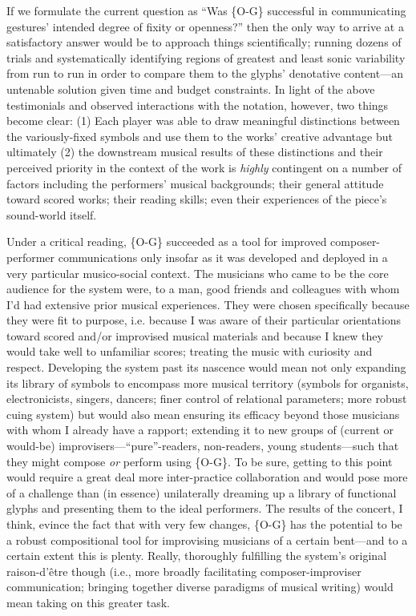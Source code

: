     If we formulate the current question as ``Was \{O-G\} successful in communicating gestures' intended degree of fixity or openness?'' then the only way to arrive at a satisfactory answer would be to approach things scientifically; running dozens of trials and systematically identifying regions of greatest and least sonic variability from run to run in order to compare them to the glyphs' denotative content---an untenable solution given time and budget constraints. In light of the above testimonials and observed interactions with the notation, however, two things become clear: (1) Each player was able to draw meaningful distinctions between the variously-fixed symbols and use them to the works' creative advantage but ultimately (2) the downstream musical results of these distinctions and their perceived priority in the context of the work is \textit{highly} contingent on a number of factors including the performers' musical backgrounds; their general attitude toward scored works; their reading skills; even their experiences of the piece's sound-world itself.

    Under a critical reading, \{O-G\} succeeded as a tool for improved composer-performer communications only insofar as it was developed and deployed in a very particular musico-social context. The musicians who came to be the core audience for the system were, to a man, good friends and colleagues with whom I'd had extensive prior musical experiences. They were chosen specifically because they were fit to purpose, i.e. because I was aware of their particular orientations toward scored and/or improvised musical materials and because I knew they would take well to unfamiliar scores; treating the music with curiosity and respect. Developing the system past its nascence would mean not only expanding its library of symbols to encompass more musical territory (symbols for organists, electronicists, singers, dancers; finer control of relational parameters; more robust cuing system) but would also mean ensuring its efficacy beyond those musicians with whom I already have a rapport; extending it to new groups of (current or would-be) improvisers---``pure''-readers, non-readers, young students---such that they might compose \textit{or} perform using \{O-G\}. To be sure, getting to this point would require a great deal more inter-practice collaboration and would pose more of a challenge than (in essence) unilaterally dreaming up a library of functional glyphs and presenting them to the ideal performers. The results of the concert, I think, evince the fact that with very few changes, \{O-G\} has the potential to be a robust compositional tool for improvising musicians of a certain bent---and to a certain extent this is plenty. Really, thoroughly fulfilling the system's original raison-d'\^{e}tre though (i.e., more broadly facilitating composer-improviser communication; bringing together diverse paradigms of musical writing) would mean taking on this greater task.

